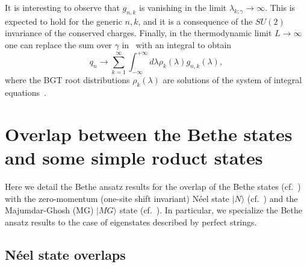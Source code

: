 \documentclass[11pt]{iopart}
\begin{document}
%
It is interesting to observe that $g_{n,k}$ is vanishing in the limit $\lambda_{k;\gamma}\to\infty$. 
This is expected to hold for the generic $n,k$, and it is a consequence of the $SU(2)$ invariance 
of the conserved charges. Finally, in the thermodynamic limit $L\to\infty$ one can replace the 
sum over $\gamma$ in~ with an integral to obtain  
%
\begin{equation}
\label{q0-th}
q_n\to\sum_{k=1}^\infty\int_{-\infty}^{+\infty}d\lambda\rho_k(\lambda)g_{n,k}(\lambda), 
\end{equation}
%
where the BGT root distributions $\rho_k(\lambda)$ are solutions of the system of integral 
equations~. 



\section{Overlap between the Bethe states and some simple roduct states} 
\label{sec:2}

Here we detail the Bethe ansatz results for the overlap of the Bethe states (cf.~) 
with the zero-momentum (one-site shift invariant) N\'eel state $|N\rangle$ (cf.~) 
and the Majumdar-Ghosh (MG) $|MG\rangle$ state (cf.~). In particular, we specialize 
the Bethe ansatz results to the case of eigenstates described by perfect strings. 

\subsection{N\'eel state overlaps}
\label{sec:2.1}
\end{document}
